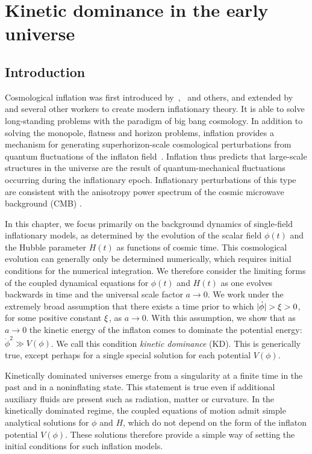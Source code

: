 \chapter{Kinetic dominance in the early universe}
\label{chp:kd}

\section{Introduction}

Cosmological inflation was first introduced by~\cite{starobinskii_spectrum_1979},~\cite{guth_inflationary_1981} and others, and extended by~\cite{linde_1982} and several other workers to create modern inflationary theory. It is able to solve long-standing problems with the paradigm of big bang cosmology. In addition to solving the monopole, flatness and horizon problems, inflation provides a mechanism for generating superhorizon-scale cosmological perturbations from quantum fluctuations of the inflaton field~\citep[see, for example][]{mukhanov_theory_1992}. Inflation thus predicts that large-scale structures in the universe are the result of quantum-mechanical fluctuations occurring during the inflationary epoch. Inflationary perturbations of this type are consistent with the anisotropy power spectrum of the cosmic microwave background (CMB) \citep{hinshaw_nine-year_2012,planck_collaboration_planck_2013}.

In this chapter, we focus primarily on the background dynamics of single-field inflationary models, as determined by the evolution of the scalar field \(\phi(t)\) and the Hubble parameter \(H(t)\) as functions of cosmic time.  This cosmological evolution can generally only be determined numerically, which requires initial conditions for the numerical integration.  We therefore consider the limiting forms of the coupled dynamical equations for \(\phi(t)\) and \(H(t)\) as one evolves backwards in time and the universal scale factor \(a\to 0\). We work under the extremely broad assumption that there exists a time prior to which \(|\dot{\phi}| > \xi > 0\), for some positive constant \(\xi\), as \(a \to 0\).  With this assumption, we show that as \(a\to 0\) the kinetic energy of the inflaton comes to dominate the potential energy: \(\dot{\phi}^2\gg V(\phi)\). We call this condition {\em kinetic dominance\/} (KD). This is generically true, except perhaps for a single special solution for each potential \(V(\phi)\).

Kinetically dominated universes emerge from a singularity at a finite time in the past and in a noninflating state. This statement is true even if additional auxiliary fluids are present such as radiation, matter or curvature.  In the kinetically dominated regime, the coupled equations of motion admit simple analytical solutions for \(\phi\) and \(H\), which do not depend on the form of the inflaton potential \(V(\phi)\).  These solutions therefore provide a simple way of setting the initial conditions for such inflation models.

